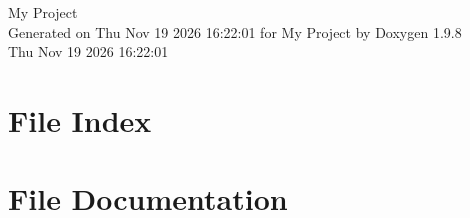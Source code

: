 \documentclass[twoside]{book}
\newcommand{\+}{\discretionary{\mbox{\scriptsize$\hookleftarrow$}}{}{}}
\newcommand{\clearemptydoublepage}{%
    \newpage{\pagestyle{empty}\cleardoublepage}%
  }
\begin{document}
  \raggedbottom
    \hypersetup{pageanchor=false,
                bookmarksnumbered=true,
                pdfencoding=unicode
               }
  \begin{titlepage}
  \vspace*{7cm}
  \begin{center}%
  {\Large My Project}\\
  \vspace*{1cm}
  {\large Generated on Thu Nov 19 2026 16\+:22\+:01 for My Project by Doxygen 1.9.8}\\
    \vspace*{0.5cm}
    {\small Thu Nov 19 2026 16:22:01}
  \end{center}
  \end{titlepage}
  \clearemptydoublepage
  \tableofcontents
  \clearemptydoublepage
  \hypersetup{pageanchor=true}

\chapter{File Index}

\chapter{File Documentation}


  \backmatter
  \newpage
  \clearemptydoublepage
  \printindex
\end{document}
